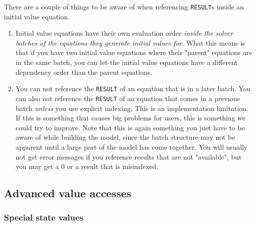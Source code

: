 \documentclass[11pt]{article}
\theoremstyle{definition}
\begin{document}
There are a couple of things to be aware of when referencing {\tt RESULT}s inside an initial value equation.
\begin{enumerate}[i]
\item Initial value equations have their own evaluation order \emph{inside the solver batches of the equations they generate initial values for}. What this means is that if you have two initial value equations where their "parent" equations are in the same batch, you can let the initial value equations have a different dependency order than the parent equations.
\item You can not reference the {\tt RESULT} of an equation that is in a later batch. You can also not reference the {\tt RESULT} of an equation that comes in a previous batch \emph{unless} you use explicit indexing. This is an implementation limitation. If this is something that causes big problems for users, this is something we could try to improve. Note that this is again something you just have to be aware of while building the model, since the batch structure may not be apparent until a large part of the model has come together. You will usually not get error messages if you reference results that are not "available", but you may get a 0 or a result that is misindexed.
\end{enumerate}

\subsection{Advanced value accesses}\label{sec:advancedaccess}

\subsubsection{Special state values}
\end{document}
